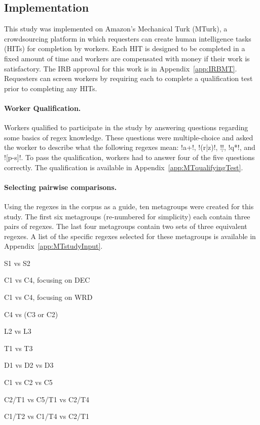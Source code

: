 \subsection{Implementation}
This study was implemented on Amazon's Mechanical Turk (MTurk),  a crowdsourcing platform in which requesters can create human intelligence tasks (HITs) for completion by workers. Each HIT is designed to be completed in a fixed amount of time and workers are compensated with money if their work is satisfactory. The IRB approval for this work is in Appendix~\ref{app:IRBMT}.  Requesters can screen workers by requiring each to complete a qualification test prior to completing any HITs.

\paragraph{Worker Qualification.} Workers qualified to participate in the study by answering questions regarding some basics of regex knowledge. These questions were multiple-choice and asked the worker to describe what the following regexes mean: \cverb!a+!, \cverb!(r|z)!, \cverb!\d!, \cverb!q*!, and \cverb![p-s]!. To pass the qualification, workers had to answer four of the five questions correctly.  The qualification is available in Appendix~\ref{app:MTqualifyingTest}.

\paragraph{Selecting pairwise comparisons.}  Using the regexes in the corpus as a guide, ten metagroups were created for this study.  The first six metagroups (re-numbered for simplicity) each contain three pairs of regexes.  The last four metagroups contain two sets of three equivalent regexes.  A list of the specific regexes selected for these metagroups is available in Appendix~\ref{app:MTstudyInput}.

\begin{multicols}{2}
\begin{description}[noitemsep,topsep=0pt]
\item[M1]  S1 vs S2
\item[M2]  C1 vs C4, focusing on DEC
\item[M3]  C1 vs C4, focusing on WRD
\item[M4]  C4 vs (C3 or C2)
\item[M5]  L2 vs L3
\item[M6]  T1 vs T3
\item[M7]  D1 vs D2 vs D3
\item[M8]  C1 vs C2 vs C5
\item[M9]  C2/T1 vs C5/T1 vs C2/T4
\item[M10] C1/T2 vs C1/T4 vs C2/T1
\end{description}
\end{multicols}

